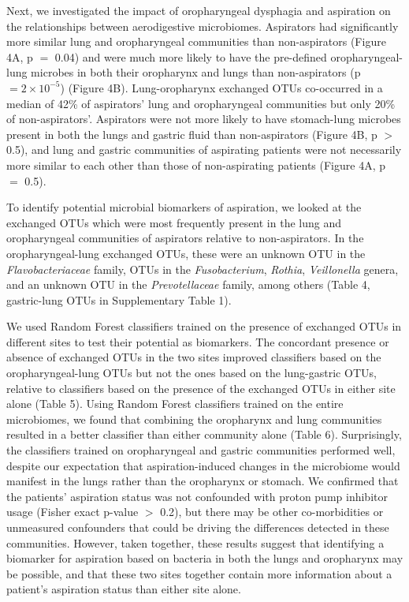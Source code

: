 Next, we investigated the impact of oropharyngeal dysphagia and aspiration on the relationships between aerodigestive microbiomes.
Aspirators had significantly more similar lung and oropharyngeal communities than non-aspirators (Figure 4A, p $=$ 0.04) and were much more likely to have the pre-defined oropharyngeal-lung microbes in both their oropharynx and lungs than non-aspirators (p $= 2 \times 10^{-5}$) (Figure 4B).
Lung-oropharynx exchanged OTUs co-occurred in a median of 42\% of aspirators' lung and oropharyngeal communities but only 20\% of non-aspirators'.
Aspirators were not more likely to have stomach-lung microbes present in both the lungs and gastric fluid than non-aspirators (Figure 4B, p $>$ 0.5), and lung and gastric communities of aspirating patients were not necessarily more similar to each other than those of non-aspirating patients (Figure 4A, p $=$ 0.5).

To identify potential microbial biomarkers of aspiration, we looked at the exchanged OTUs which were most frequently present in the lung and oropharyngeal communities of aspirators relative to non-aspirators.
In the oropharyngeal-lung exchanged OTUs, these were an unknown OTU in the \textit{Flavobacteriaceae} family, OTUs in the \textit{Fusobacterium}, \textit{Rothia}, \textit{Veillonella} genera, and an unknown OTU in the \textit{Prevotellaceae} family, among others (Table 4, gastric-lung OTUs in Supplementary Table 1).

We used Random Forest classifiers trained on the presence of exchanged OTUs in different sites to test their potential as biomarkers.
The concordant presence or absence of exchanged OTUs in the two sites improved classifiers based on the oropharyngeal-lung OTUs but not the ones based on the lung-gastric OTUs, relative to classifiers based on the presence of the exchanged OTUs in either site alone (Table 5).
Using Random Forest classifiers trained on the entire microbiomes, we found that combining the oropharynx and lung communities resulted in a better classifier than either community alone (Table 6).
Surprisingly, the classifiers trained on oropharyngeal and gastric communities performed well, despite our expectation that aspiration-induced changes in the microbiome would manifest in the lungs rather than the oropharynx or stomach.
We confirmed that the patients' aspiration status was not confounded with proton pump inhibitor usage (Fisher exact p-value $>$ 0.2), but there may be other co-morbidities or unmeasured confounders that could be driving the differences detected in these communities.
However, taken together, these results suggest that identifying a biomarker for aspiration based on bacteria in both the lungs and oropharynx may be possible, and that these two sites together contain more information about a patient’s aspiration status than either site alone.

